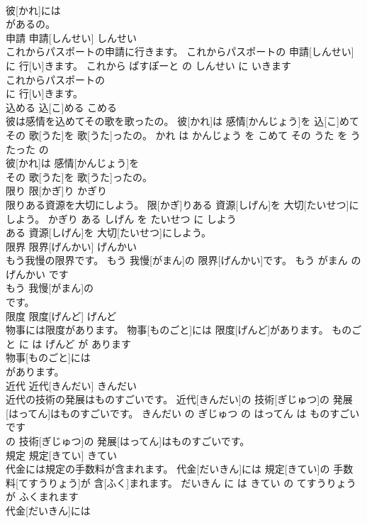 \documentclass[8pt]{extreport}
\begin{document}
\begin{CJK}{UTF8}{min}
\\	彼[かれ]には
\\	があるの。			
\\	申請	申請[しんせい]	しんせい	
\\	これからパスポートの申請に行きます。	これからパスポートの 申請[しんせい]に 行[い]きます。	これから ぱすぽーと の しんせい に いきます	
\\	これからパスポートの
\\	に 行[い]きます。			
\\	込める	込[こ]める	こめる	
\\	彼は感情を込めてその歌を歌ったの。	彼[かれ]は 感情[かんじょう]を 込[こ]めてその 歌[うた]を 歌[うた]ったの。	かれ は かんじょう を こめて その うた を うたった の	
\\	彼[かれ]は 感情[かんじょう]を
\\	その 歌[うた]を 歌[うた]ったの。			
\\	限り	限[かぎ]り	かぎり	
\\	限りある資源を大切にしよう。	限[かぎ]りある 資源[しげん]を 大切[たいせつ]にしよう。	かぎり ある しげん を たいせつ に しよう	
\\	ある 資源[しげん]を 大切[たいせつ]にしよう。			
\\	限界	限界[げんかい]	げんかい	
\\	もう我慢の限界です。	もう 我慢[がまん]の 限界[げんかい]です。	もう がまん の げんかい です	
\\	もう 我慢[がまん]の
\\	です。			
\\	限度	限度[げんど]	げんど	
\\	物事には限度があります。	物事[ものごと]には 限度[げんど]があります。	ものごと に は げんど が あります	
\\	物事[ものごと]には
\\	があります。			
\\	近代	近代[きんだい]	きんだい	
\\	近代の技術の発展はものすごいです。	近代[きんだい]の 技術[ぎじゅつ]の 発展[はってん]はものすごいです。	きんだい の ぎじゅつ の はってん は ものすごい です	
\\	の 技術[ぎじゅつ]の 発展[はってん]はものすごいです。			
\\	規定	規定[きてい]	きてい	
\\	代金には規定の手数料が含まれます。	代金[だいきん]には 規定[きてい]の 手数料[てすうりょう]が 含[ふく]まれます。	だいきん に は きてい の てすうりょう が ふくまれます	
\\	代金[だいきん]には

\end{CJK}
\end{document}
